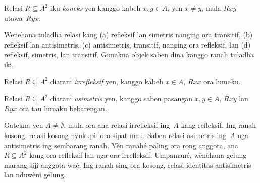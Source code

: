 \documentclass[../../../include/open-logic-section]{subfiles}
\begin{document}
\begin{defn}[Koneksitas]
Relasi $R \subseteq A^2$ iku \emph{koneks} yen kanggo kabeh
$x,y\in A$, yen $x \neq y$, mula $Rxy$ utawa~$Ryx$.
\end{defn}

\begin{prob}
Wenehana tuladha relasi kang (a) refleksif lan simetris
nanging ora transitif, (b) refleksif lan antisimetris,
(c) antisimetris, transitif, nanging ora refleksif, lan
(d) refleksif, simetris, lan transitif.
Gunakna objek saben dina kanggo ranah tuladha iki.
\end{prob}

\begin{defn}[Irrefleksivitas]
Relasi $R \subseteq A^2$ diarani \emph{irrefleksif}
yen, kanggo kabeh $x \in A$, $Rxx$ ora lumaku.
\end{defn}

\begin{defn}[Asimetri]
Relasi $R \subseteq A^2$ diarani \emph{asimetris}
yen, kanggo saben pasangan $x,y\in A$, $Rxy$ lan~$Ryx$
ora tau lumaku bebarengan.
\end{defn}

Gatekna yen $A \neq \emptyset$, mula ora ana relasi
irrefleksif ing~$A$ kang refleksif. Ing ranah kosong,
relasi kosong nyukupi loro sipat mau. Saben relasi
asimetris ing~$A$ uga antisimetris ing sembarang ranah.
Yèn ranahé paling ora rong anggota, ana $R \subseteq A^2$ kang
ora refleksif lan uga ora irrefleksif. Umpamané, wènèhana gelung marang
siji anggota waé. Ing ranah sing ora kosong, relasi
identitas antisimetris lan nduwèni gelung.
\end{document}
